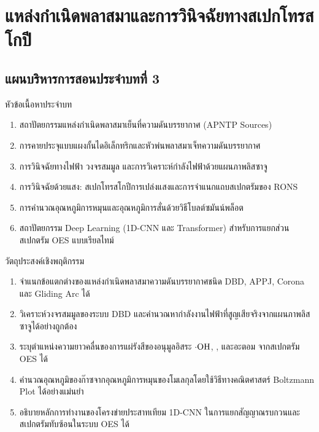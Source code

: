 \chapter{แหล่งกำเนิดพลาสมาและการวินิจฉัยทางสเปกโทรสโกปี}
\label{chap:ch03}


\vspace*{-6pt}
\section*{แผนบริหารการสอนประจำบทที่ 3}

\begin{planbox}{หัวข้อเนื้อหาประจำบท}
\begin{enumerate}
    \item สถาปัตยกรรมแหล่งกำเนิดพลาสมาเย็นที่ความดันบรรยากาศ (APNTP Sources)
    \item การคายประจุแบบแผงกั้นไดอิเล็กทริกและหัวพ่นพลาสมาเจ็ทความดันบรรยากาศ
    \item การวินิจฉัยทางไฟฟ้า วงจรสมมูล และการวิเคราะห์กำลังไฟฟ้าด้วยแผนภาพลิสซาจู
    \item การวินิจฉัยด้วยแสง: สเปกโทรสโกปีการเปล่งแสงและการจำแนกแถบสเปกตรัมของ RONS
    \item การคำนวณอุณหภูมิการหมุนและอุณหภูมิการสั่นด้วยวิธีโบลต์ซมันน์พล็อต
    \item สถาปัตยกรรม Deep Learning (1D-CNN และ Transformer) สำหรับการแยกส่วนสเปกตรัม OES แบบเรียลไทม์
\end{enumerate}
\end{planbox}

\begin{planbox}{วัตถุประสงค์เชิงพฤติกรรม}
\begin{enumerate}
    \item จำแนกข้อแตกต่างของแหล่งกำเนิดพลาสมาความดันบรรยากาศชนิด DBD, APPJ, Corona และ Gliding Arc ได้
    \item วิเคราะห์วงจรสมมูลของระบบ DBD และคำนวณหากำลังงานไฟฟ้าที่สูญเสียจริงจากแผนภาพลิสซาจูได้อย่างถูกต้อง
    \item ระบุตำแหน่งความยาวคลื่นของการแผ่รังสีของอนุมูลอิสระ $\cdot\ce{OH}$, , และอะตอม  จากสเปกตรัม OES ได้
    \item คำนวณอุณหภูมิของก๊าซจากอุณหภูมิการหมุนของโมเลกุลโดยใช้วิธีทางคณิตศาสตร์ Boltzmann Plot ได้อย่างแม่นยำ
    \item อธิบายหลักการทำงานของโครงข่ายประสาทเทียม 1D-CNN ในการแยกสัญญาณรบกวนและสเปกตรัมทับซ้อนในระบบ OES ได้
\end{enumerate}
\end{planbox}

